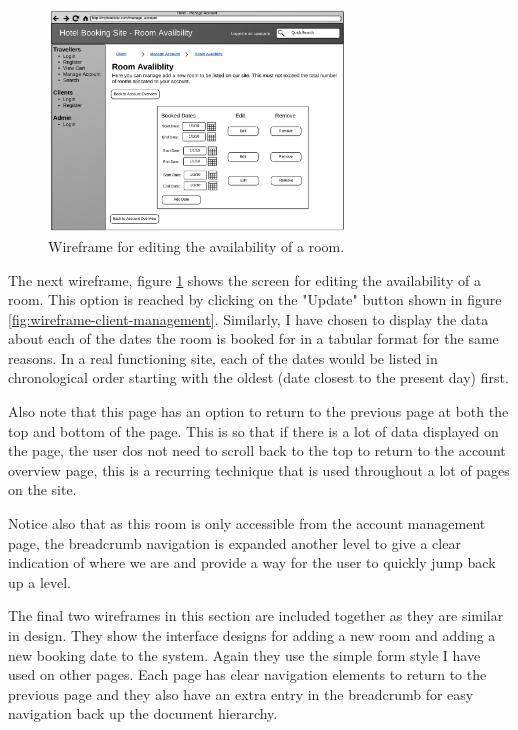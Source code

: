 \documentclass{article}
\begin{document}
\begin{figure}[H]
\centering
\includegraphics[width=0.7\textwidth]{img/wireframes/EditAvalibility.png}
\caption{Wireframe for editing the availability of a room.}
\label{fig:wireframe-client-availability}
\end{figure}

The next wireframe, figure \ref{fig:wireframe-client-availability} shows the screen for editing the availability of a room. This option is reached by clicking on the "Update" button shown in figure \ref{fig:wireframe-client-management}. Similarly, I have chosen to display the data about each of the dates the room is booked for in a tabular format for the same reasons. In a real functioning site, each of the dates would be listed in chronological order starting with the oldest (date closest to the present day) first. 

Also note that this page has an option to return to the previous page at both the top and bottom of the page. This is so that if there is a lot of data displayed on the page, the user dos not need to scroll back to the top to return to the account overview page, this is a recurring technique that is used throughout a lot of pages on the site.

Notice also that as this room is only accessible from the account management page, the breadcrumb navigation is expanded another level to give a clear indication of where we are and provide a way for the user to quickly jump back up a level.

The final two wireframes in this section are included together as they are similar in design. They show the interface designs for adding a new room and adding a new booking date to the system. Again they use the simple form style I have used on other pages. Each page has clear navigation elements to return to the previous page and they also have an extra entry in the breadcrumb for easy navigation back up the document hierarchy. 
\end{document}
